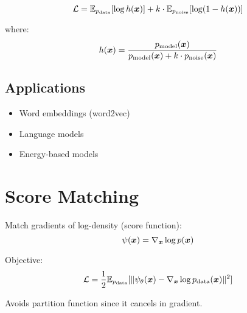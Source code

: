 \begin{equation}
\mathcal{L} = \mathbb{E}_{p_{\text{data}}}[\log h(\boldsymbol{x})] + k \cdot \mathbb{E}_{p_{\text{noise}}}[\log(1-h(\boldsymbol{x}))]
\end{equation}

where:
\begin{equation}
h(\boldsymbol{x}) = \frac{p_{\text{model}}(\boldsymbol{x})}{p_{\text{model}}(\boldsymbol{x}) + k \cdot p_{\text{noise}}(\boldsymbol{x})}
\end{equation}

\subsection{Applications}

\begin{itemize}
    \item Word embeddings (word2vec)
    \item Language models
    \item Energy-based models
\end{itemize}

\section{Score Matching}
\label{sec:score-matching}

Match gradients of log-density (score function):
\begin{equation}
\psi(\boldsymbol{x}) = \nabla_{\boldsymbol{x}} \log p(\boldsymbol{x})
\end{equation}

Objective:
\begin{equation}
\mathcal{L} = \frac{1}{2} \mathbb{E}_{p_{\text{data}}}[\|\psi_{\theta}(\boldsymbol{x}) - \nabla_{\boldsymbol{x}} \log p_{\text{data}}(\boldsymbol{x})\|^2]
\end{equation}

Avoids partition function since it cancels in gradient.
